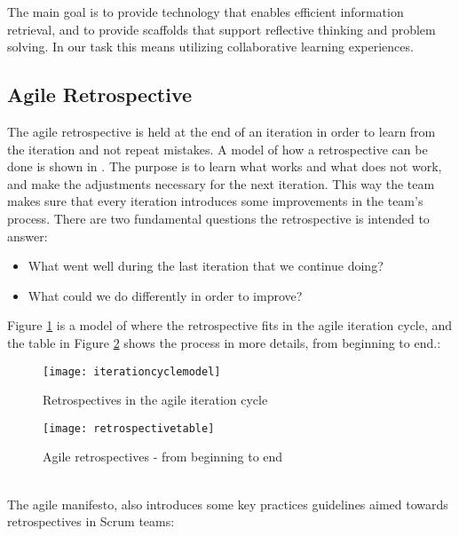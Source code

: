 The main goal is to provide technology that enables efficient information retrieval, and to provide scaffolds that support reflective thinking and problem solving. In our task this means utilizing collaborative learning experiences. 

\subsection{Agile Retrospective}
The agile retrospective is held at the end of an iteration in order to learn from the iteration and not repeat mistakes. A model of how a retrospective can be done is shown in \cite{Derby2006}. The purpose is to learn what works and what does not work, and make the adjustments necessary for the next iteration. This way the team makes sure that every iteration introduces some improvements in the team's process. There are two fundamental questions the retrospective is intended to answer:
\begin{itemize}
\item What went well during the last iteration that we continue doing?
\item What could we do differently in order to improve?
\end{itemize}
Figure \ref{fig:itcyclemodel} is a model of where the retrospective fits in the agile iteration cycle\cite{Derby2006}, and the table in Figure \ref{fig:retrospectivetable} shows the process in more details, from beginning to end.\cite{Derby2006}:
\begin{figure}[!htpb]
\centering
	\texttt{[image: iterationcyclemodel]}
\caption{Retrospectives in the agile iteration cycle}
\label{fig:itcyclemodel}
\end{figure}
\begin{figure}[!htpb]
\centering
	\texttt{[image: retrospectivetable]}
\caption{Agile retrospectives - from beginning to end}
\label{fig:retrospectivetable}
\end{figure}
\\
The agile manifesto, also introduces some key practices guidelines aimed towards retrospectives in Scrum teams\cite{agilemanifesto}:
